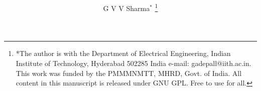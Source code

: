 \documentclass[journal,12pt,twocolumn]{IEEEtran}
\begin{document}
\let\StandardTheFigure\thefigure
\let\StandardTheTable\thetable
\renewcommand{\thefigure}{\theproblem}
\renewcommand{\thetable}{\theproblem}




\def\putbox#1#2#3{\makebox[0in][l]{\makebox[#1][l]{}\raisebox{\baselineskip}[0in][0in]{\raisebox{#2}[0in][0in]{#3}}}}
     \def\rightbox#1{\makebox[0in][r]{#1}}
     \def\centbox#1{\makebox[0in]{#1}}
     \def\topbox#1{\raisebox{-\baselineskip}[0in][0in]{#1}}
     \def\midbox#1{\raisebox{-0.5\baselineskip}[0in][0in]{#1}}



\title{
}


%
%
%

\author{G V V Sharma$^{*}$%
\thanks{*The author is with the Department
of Electrical Engineering, Indian Institute of Technology, Hyderabad
502285 India e-mail:  gadepall@iith.ac.in. This work was funded by the PMMMNMTT, MHRD, Govt. of India.  All content in this manuscript is released under GNU GPL.  Free to use for  all. }%
}
% 
%
\end{document}
